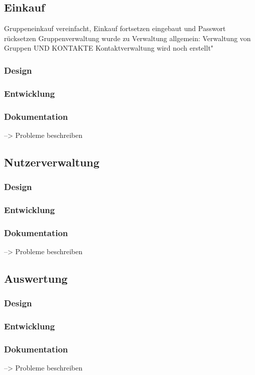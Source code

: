 \documentclass[12pt,a4paper]{article}
\begin{document}
\subsection{Einkauf}
Gruppeneinkauf vereinfacht, Einkauf fortsetzen eingebaut und Passwort rücksetzen
Gruppenverwaltung wurde zu Verwaltung allgemein:  Verwaltung von Gruppen UND KONTAKTE 
Kontaktverwaltung wird noch erstellt"
\subsubsection*{Design}
\subsubsection*{Entwicklung}
\subsubsection*{Dokumentation} --> Probleme beschreiben
\newpage

\subsection{Nutzerverwaltung}
\subsubsection*{Design}
\subsubsection*{Entwicklung}
\subsubsection*{Dokumentation} --> Probleme beschreiben
\newpage

\subsection{Auswertung}
\subsubsection*{Design}
\subsubsection*{Entwicklung}
\subsubsection*{Dokumentation} --> Probleme beschreiben
\newpage
\end{document}
